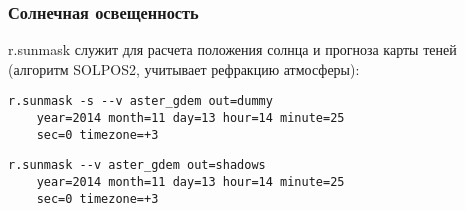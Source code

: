 
\begin{frame}
    \frametitle{Солнечная освещенность}
    r.sunmask служит для расчета положения солнца и прогноза карты теней (алгоритм SOLPOS2, учитывает рефракцию атмосферы):
    \begin{verbatim}
r.sunmask -s --v aster_gdem out=dummy
    year=2014 month=11 day=13 hour=14 minute=25
    sec=0 timezone=+3
    \end{verbatim}

    \begin{verbatim}
r.sunmask --v aster_gdem out=shadows
    year=2014 month=11 day=13 hour=14 minute=25
    sec=0 timezone=+3
    \end{verbatim}
\end{frame}

